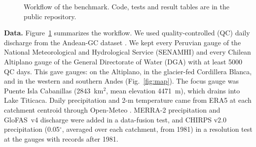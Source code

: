 \documentclass[graybox]{svmult}
\begin{document}
\begin{figure}[tb]
\centering
{}
\caption{Workflow of the benchmark. Code, tests and result tables are in the public repository.}
\label{fig:flow}
\end{figure}

\textbf{Data.} Figure~\ref{fig:flow} summarizes the workflow. We used quality-controlled (QC) daily discharge from the Andean-GC dataset \cite{aguayo2026andeangc}. We kept every Peruvian gauge of the National Meteorological and Hydrological Service (SENAMHI) and every Chilean Altiplano gauge of the General Directorate of Water (DGA) with at least 5000 QC days. This gave \nGauges{} gauges: \nGaugesAlti{} on the Altiplano, \nGaugesCB{} in the glacier-fed Cordillera Blanca, and \nGaugesWSA{} in the western and southern Andes (Fig.~\ref{fig:map}). The focus gauge was Puente Isla Cabanillas (2843~km$^2$, mean elevation 4471~m), which drains into Lake Titicaca. Daily precipitation and 2-m temperature came from ERA5 \cite{hersbach2020era5} at each catchment centroid through Open-Meteo \cite{openmeteo}. MERRA-2 precipitation and GloFAS~v4 discharge were added in a data-fusion test, and CHIRPS v2.0 precipitation (0.05$^\circ$, averaged over each catchment, from 1981) \cite{funk2015chirps} in a resolution test at the \nChirps{} gauges with records after 1981.
\end{document}
